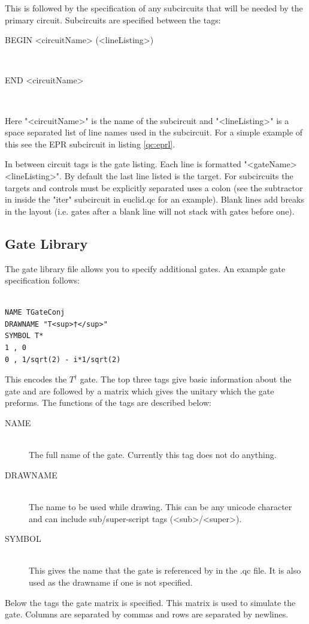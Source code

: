 \documentclass[10pt]{article}
\theoremstyle{definition}
\begin{document}
This is followed by the specification of any subcircuits that will be needed by the primary circuit.
Subcircuits are specified between the tags:
\begin{description}
\item[BEGIN <circuitName> (<lineListing>)] \hfill \\
\item[END <circuitName>] \hfill \\
\end{description}
Here "<circuitName>" is the name of the subcircuit and "<lineListing>" is a space separated list of line names
used in the subcircuit. For a simple example of this see the EPR subcircuit in listing \ref{qc:eprl}.

In between circuit tags is the gate listing.  Each line is formatted "<gateName> <lineListing>".
By default the last line listed is the target.  For subcircuits the targets and controls must be explicitly 
separated uses a colon (see the subtractor in inside the "iter" subcircuit in euclid.qc for an example).
Blank lines add breaks in the layout (i.e. gates after a blank line will not stack with gates before one).

\subsection{Gate Library}
The gate library file allows you to specify additional gates.  An example gate specification follows:

\small
\begin{verbatim}

NAME TGateConj
DRAWNAME "T<sup>†</sup>"
SYMBOL T*
1 , 0
0 , 1/sqrt(2) - i*1/sqrt(2)

\end{verbatim}
\normalsize

This encodes the $T^\dagger$ gate. The top three tags give basic information about the gate and 
are followed by a matrix which gives the unitary which the gate preforms.  The functions of the 
tags are described below:
\begin{description}
\item[NAME] \hfill \\
The full name of the gate.  Currently this tag does not do anything.
\item[DRAWNAME] \hfill \\
The name to be used while drawing.  This can be any unicode character 
and can include sub/super-script tags (<sub>/<super>).
\item[SYMBOL] \hfill \\
This gives the name that the gate is referenced by in the .qc file.  It is also used as the drawname if one is not
specified.
\end{description}
Below the tags the gate matrix is specified.  This matrix is used to simulate the gate.  Columns are separated by commas
and rows are separated by newlines.
\end{document}
